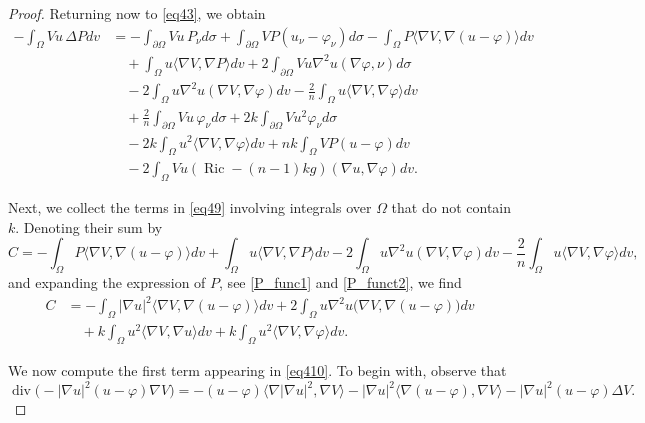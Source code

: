 \documentclass[reqno,11pt]{amsart}
\numberwithin{equation}{section}  %
\begin{document}
\begin{proof}
Returning now to \eqref{eq43}, we obtain
\begin{align}\label{eq49}
-\int_{\Omega}Vu\,\Delta P dv
&=
-\int_{\partial\Omega}Vu\,P_{\nu}d\sigma
+
\int_{\partial\Omega}VP(u_{\nu}-\varphi_{\nu})d\sigma
-
\int_{\Omega}P\langle\nabla V,\nabla(u-\varphi)\rangle dv
\nonumber\\
&\quad
+
\int_{\Omega}u\langle\nabla V,\nabla P\rangle dv
+
2\int_{\partial\Omega}Vu\nabla^{2}u(\nabla\varphi,\nu) d\sigma
\nonumber\\
&\quad
-
2\int_{\Omega}u\nabla^{2}u(\nabla V,\nabla\varphi) dv
-
\frac{2}{n}\int_{\Omega}u\langle\nabla V,\nabla\varphi\rangle dv
\nonumber\\
&\quad
+
\frac{2}{n}\int_{\partial\Omega}Vu\,\varphi_{\nu} d\sigma
+
2k\int_{\partial\Omega}Vu^{2}\varphi_{\nu} d\sigma
\nonumber\\
&\quad
-
2k\int_{\Omega}u^{2}\langle\nabla V,\nabla\varphi\rangle dv
+
nk\int_{\Omega}VP(u-\varphi) dv
\nonumber\\
&\quad
-
2\int_{\Omega}Vu(\operatorname{Ric}-(n-1)kg)(\nabla u,\nabla\varphi) dv.
\end{align}

Next, we collect the terms in \eqref{eq49} involving integrals over \(\Omega\) that do not contain \(k\). Denoting their sum by
\[
C
=
-\int_{\Omega}P\langle\nabla V,\nabla(u-\varphi)\rangle dv
+
\int_{\Omega}u\langle\nabla V,\nabla P\rangle dv
-
2\int_{\Omega}u\nabla^{2}u(\nabla V,\nabla\varphi)dv
-
\frac{2}{n}\int_{\Omega}u\langle\nabla V,\nabla\varphi\rangle dv,
\]
and expanding the expression of \(P\), see \eqref{P_func1} and \eqref{P_funct2}, we find
\begin{align}\label{eq410}
C
&=
-\int_{\Omega}|\nabla u|^{2}
\langle\nabla V,\nabla(u-\varphi)\rangle dv
+
2\int_{\Omega}u\nabla^{2}u\bigl(\nabla V,\nabla(u-\varphi)\bigr) dv
\nonumber\\
&\quad
+
k\int_{\Omega}u^{2}\langle\nabla V,\nabla u\rangle dv
+
k\int_{\Omega}u^{2}\langle\nabla V,\nabla\varphi\rangle dv.
\end{align}

We now compute the first term appearing in \eqref{eq410}. To begin with, observe that
\[
\operatorname{div}\bigl(-|\nabla u|^{2}(u-\varphi)\nabla V\bigr)
=
-(u-\varphi)\langle\nabla |\nabla u|^{2},\nabla V\rangle
-
|\nabla u|^{2}\langle\nabla(u-\varphi),\nabla V\rangle
-
|\nabla u|^{2}(u-\varphi)\Delta V.
\]


\end{proof}
\end{document}
